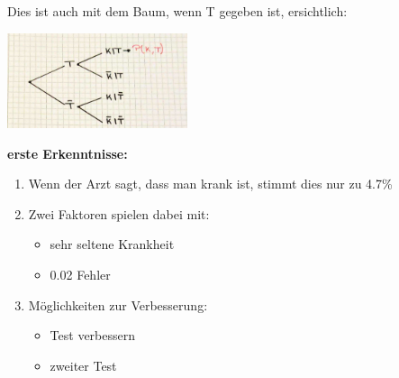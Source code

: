 \documentclass[a4paper]{article}
\newenvironment{Figure}
	{\par\medskip\noindent\minipage{\linewidth}}
	{\endminipage\par\medskip}
\theoremstyle{definition}
\theoremstyle{example}
\begin{document}
Dies ist auch mit dem Baum, wenn T gegeben ist, ersichtlich:\\

\begin{Figure}
\centering
\includegraphics[width=200px]{img/BaumTgegeben.jpg}
	\label{fig:Baum inkl. Wsk wenn T gegeben}
\end{Figure}

\textbf{erste Erkenntnisse:}
\begin{enumerate}
	\item {Wenn der Arzt sagt, dass man krank ist, stimmt dies nur zu 4.7\%}
	\item {Zwei Faktoren spielen dabei mit:
		\begin{itemize}
			\item sehr seltene Krankheit
			\item 0.02 Fehler
		\end{itemize}
	}
	\item {Möglichkeiten zur Verbesserung:
		\begin{itemize}
			\item Test verbessern
			\item zweiter Test
		\end{itemize}
	}
\end{enumerate}
\end{document}
